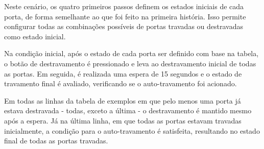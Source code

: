 Neste cenário, os quatro primeiros passos definem os estados iniciais de cada porta, de forma semelhante ao que foi feito na primeira história. Isso permite configurar 
todas as combinações possíveis de portas travadas ou destravadas como estado inicial.

Na condição inicial, após o estado de cada porta ser definido com base na tabela, o botão de destravamento é pressionado e leva ao destravamento inicial de todas as 
portas. Em seguida, é realizada uma espera de 15 segundos e o estado de travamento final é avaliado,  verificando se o auto-travamento foi acionado.

Em todas as linhas da tabela de exemplos em que pelo menos uma porta já estava destravada - todas, exceto a última - o destravamento é mantido mesmo após a espera. 
Já na última linha, em que todas as portas estavam travadas inicialmente, a condição para o auto-travamento é satisfeita, resultando no estado final de todas as 
portas travadas.
